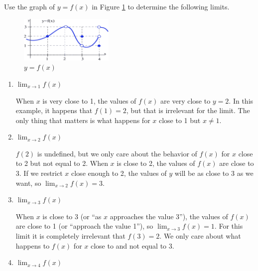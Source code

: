 \begin{example}
Use the graph of $y=f(x)$ in Figure \ref{fig:2-4-limit-ex} to determine the following limits.
\begin{figure}[!ht]
    \centering
    \includegraphics[width=0.4\textwidth]{img/chap2/image012.png}
    \caption{$y=f(x)$}
    \label{fig:2-4-limit-ex}
\end{figure}

\begin{enumerate}[label=(\alph*)]
  \item $\displaystyle\lim_{x\to 1}f(x)$

  \begin{solution}
When $x$ is very close to 1, the values of $f(x)$ are very close to $y=2$. In this example, it happens that $f(1)=2$, but that is irrelevant for the limit. The only thing that matters is what happens for $x$ close to 1 but $x\neq 1$.
    \end{solution}
  \item $\displaystyle\lim_{x\to 2}f(x)$

  \begin{solution}
$f(2)$ is undefined, but we only care about the behavior of $f(x)$ for $x$ close to 2 but not equal to 2. When $x$ is close to 2, the values of $f(x)$ are close to 3. If we restrict $x$ close enough to 2, the values of $y$ will be as close to 3 as we want, so $\displaystyle\lim_{x\to 2}f(x)=3$.
    \end{solution}
  \item $\displaystyle\lim_{x\to 3}f(x)$

  \begin{solution}
When $x$ is close to 3 (or ``as $x$ approaches the value 3''), the values of $f(x)$ are close to 1 (or ``approach the value 1''), so $\displaystyle\lim_{x\to 3}f(x)=1$. For this limit it is completely irrelevant that $f(3)=2$. We only care about what happens to $f(x)$ for $x$ close to and not equal to 3.
    \end{solution}
  \item $\displaystyle\lim_{x\to 4}f(x)$


\end{enumerate}
\end{example}
